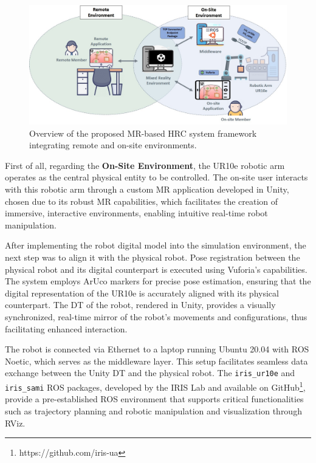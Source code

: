 \begin{figure}[h]
    \centering
    \includegraphics[width=\linewidth]{figs/framework-1.jpeg}
    \caption{Overview of the proposed \ac{MR}-based \ac{HRC} system framework integrating remote and on-site environments.}
    \label{fig:project_framework}
\end{figure}

First of all, regarding the \textbf{On-Site Environment}, the UR10e robotic arm operates as the central physical entity to be controlled. The on-site user interacts with this robotic arm through a custom \ac{MR} application developed in Unity, chosen due to its robust \ac{MR} capabilities, which facilitates the creation of immersive, interactive environments, enabling intuitive real-time robot manipulation.

After implementing the robot digital model into the simulation environment, the next step was to align it with the physical robot. Pose registration between the physical robot and its digital counterpart is executed using Vuforia's capabilities. The system employs ArUco markers for precise pose estimation, ensuring that the digital representation of the UR10e is accurately aligned with its physical counterpart. The \ac{DT} of the robot, rendered in Unity, provides a visually synchronized, real-time mirror of the robot's movements and configurations, thus facilitating enhanced interaction.

The robot is connected via Ethernet to a laptop running Ubuntu 20.04 with \ac{ROS} Noetic, which serves as the middleware layer. This setup facilitates seamless data exchange between the Unity \ac{DT} and the physical robot. The \texttt{iris\_ur10e} and \texttt{iris\_sami} \ac{ROS} packages, developed by the IRIS Lab and available on GitHub\footnote{https://github.com/iris-ua}, provide a pre-established \ac{ROS} environment that supports critical functionalities such as trajectory planning and robotic manipulation and visualization through RViz.

